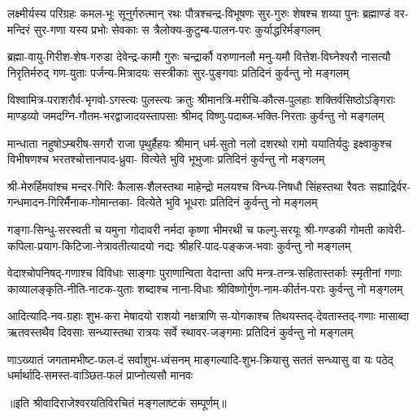 
\fourlineindentedshloka
{लक्ष्मीर्यस्य परिग्रहः कमल-भूः सूनुर्गरुत्मान् रथः}
{पौत्रश्चन्द्र-विभूषणः सुर-गुरुः शेषश्च शय्या पुनः}
{ब्रह्माण्डं वर-मन्दिरं सुर-गणा यस्य प्रभोः सेवकाः}
{स त्रैलोक्य-कुटुम्ब-पालन-परः कुर्याद्धरिर्मङ्गलम्}

\fourlineindentedshloka
{ब्रह्मा-वायु-गिरीश-शेष-गरुडा देवेन्द्र-कामौ गुरुः}
{चन्द्रार्कौ वरुणानलौ मनु-यमौ वित्तेश-विघ्नेश्वरौ}
{नासत्यौ निरृतिर्मरुद् गण-युताः पर्जन्य-मित्रादयः}
{सस्त्रीकाः सुर-पुङ्गवाः प्रतिदिनं कुर्वन्तु नो मङ्गलम्}

\fourlineindentedshloka
{विश्वामित्र-पराशरौर्व-भृगवो-ऽगस्त्यः पुलस्त्यः क्रतुः}
{श्रीमानत्रि-मरीचि-कौत्स-पुलहाः शक्तिर्वसिष्ठोऽङ्गिराः}
{माण्डव्यो जमदग्नि-गौतम-भरद्वाजादयस्तापसाः}
{श्रीमद् विष्णु-पदाब्ज-भक्ति-निरताः कुर्वन्तु नो मङ्गलम्}

\fourlineindentedshloka
{मान्धाता नहुषोऽम्बरीष-सगरौ राजा पृथुर्हैहयः}
{श्रीमान् धर्म-सुतो नलो दशरथो रामो ययातिर्यदुः}
{इक्ष्वाकुश्च विभीषणश्च भरतश्चोत्तानपाद-ध्रुवा-}
{वित्येते भुवि भूभुजाः प्रतिदिनं कुर्वन्तु नो मङ्गलम्}

\fourlineindentedshloka
{श्री-मेरुर्हिमवांश्च मन्दर-गिरिः कैलास-शैलस्तथा}
{माहेन्द्रो मलयश्च विन्ध्य-निषधौ सिंहस्तथा रैवतः}
{सह्याद्रिर्वर-गन्धमादन-गिरिर्मैनाक-गोमान्तका-}
{वित्येते भुवि भूधराः प्रतिदिनं कुर्वन्तु नो मङ्गलम्}

\fourlineindentedshloka
{गङ्गा-सिन्धु-सरस्वती च यमुना गोदावरी नर्मदा}
{कृष्णा भीमरथी च फल्गु-सरयूः श्री-गण्डकी गोमती}
{कावेरी-कपिला-प्रयाग-किटिजा-नेत्रावतीत्यादयो}
{नद्यः श्रीहरि-पाद-पङ्कज-भवाः कुर्वन्तु नो मङ्गलम्}

\fourlineindentedshloka
{वेदाश्चोपनिषद्-गणाश्च विविधाः साङ्गाः पुराणान्विता}
{वेदान्ता अपि मन्त्र-तन्त्र-सहितास्तर्काः स्मृतीनां गणाः}
{काव्यालङ्कृति-नीति-नाटक-युताः शब्दाश्च नाना-विधाः}
{श्रीविष्णोर्गुण-नाम-कीर्तन-पराः कुर्वन्तु नो मङ्गलम्}

\fourlineindentedshloka
{आदित्यादि-नव-ग्रहाः शुभ-करा मेषादयो राशयो}
{नक्षत्राणि स-योगकाश्च तिथयस्तद्-देवतास्तद्-गणाः}
{मासाब्दा ऋतवस्तथैव दिवसाः सन्ध्यास्तथा रात्रयः}
{सर्वे स्थावर-जङ्गमाः प्रतिदिनं कुर्वन्तु नो मङ्गलम्}

{णाऽख्यातं जगतामभीष्ट-फल-दं सर्वाशुभ-ध्वंसनम्}
{माङ्गल्यादि-शुभ-क्रियासु सततं सन्ध्यासु वा यः पठेद्}
{धर्मार्थादि-समस्त-वाञ्छित-फलं प्राप्नोत्यसौ मानवः}

॥इति श्रीवादिराजेश्वरयतिविरचितं मङ्गलाष्टकं सम्पूर्णम्॥